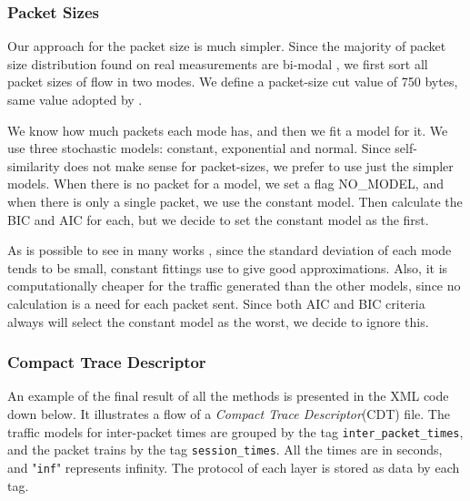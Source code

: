 \subsubsection{Packet Sizes}



Our approach for the packet size is much simpler. Since the majority of packet size distribution found on real measurements are bi-modal \cite{packet-distribution-model}\cite{sourcesonoff-paper}\cite{udp-flows-model}, we first sort all packet sizes of flow in two modes. We define a packet-size cut value of 750 bytes, same value adopted by \cite{udp-flows-model}. 


We know how much packets each mode has, and then we fit a model for it. We use three stochastic models: constant, exponential and normal. Since self-similarity does not make sense for packet-sizes, we prefer to use just the simpler models. When there is no packet for a model, we set a flag NO\_MODEL, and when there is only a single packet, we use the constant model. Then calculate the BIC and AIC for each, but we decide to set the constant model as the first.

As is possible to see in many works \cite{packet-distribution-model} \cite{udp-flows-model}, since the standard deviation of each mode tends to be small, constant fittings use to give good approximations. Also, it is computationally cheaper for the traffic generated than the other models, since no calculation is a need for each packet sent. Since both AIC and BIC criteria always will select the constant model as the worst, we decide to ignore this.


\subsubsection{Compact Trace Descriptor}


An example of the final result of all the methods is presented in the XML code down below. It illustrates a flow of a \textit{Compact Trace Descriptor}(CDT) file. The traffic models for inter-packet times are grouped by the tag \texttt{inter\_packet\_times}, and the packet trains by the tag \texttt{session\_times}. All the times are in seconds, and "\texttt{inf}" represents infinity. The protocol of each layer is stored as data by each tag.


